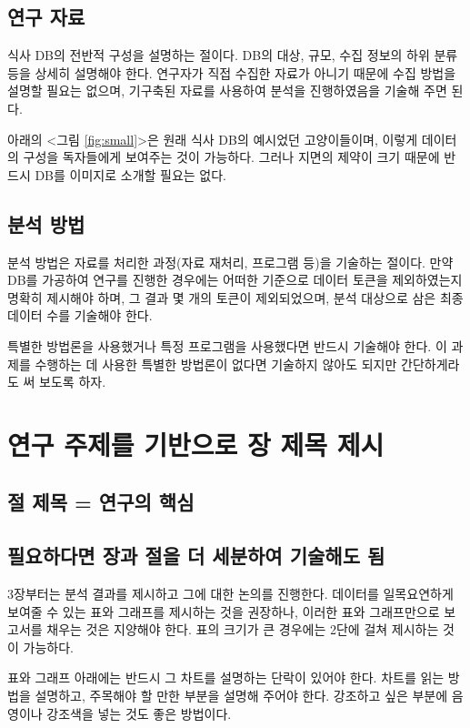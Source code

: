 \subsection{연구 자료}
식사 DB의 전반적 구성을 설명하는 절이다. DB의 대상, 규모, 수집 정보의 하위 분류 등을 상세히 설명해야 한다. 연구자가 직접 수집한 자료가 아니기 때문에 수집 방법을 설명할 필요는 없으며, 기구축된 자료를 사용하여 분석을 진행하였음을 기술해 주면 된다. 

아래의 <그림 \ref{fig:small}>은 원래 식사 DB의 예시었던 고양이들이며, 이렇게 데이터의 구성을 독자들에게 보여주는 것이 가능하다. 그러나 지면의 제약이 크기 때문에 반드시 DB를 이미지로 소개할 필요는 없다.

\subsection{분석 방법}
분석 방법은 자료를 처리한 과정(자료 재처리, 프로그램 등)을 기술하는 절이다. 만약 DB를 가공하여 연구를 진행한 경우에는 어떠한 기준으로 데이터 토큰을 제외하였는지 명확히 제시해야 하며, 그 결과 몇 개의 토큰이 제외되었으며, 분석 대상으로 삼은 최종 데이터 수를 기술해야 한다. 

특별한 방법론을 사용했거나 특정 프로그램을 사용했다면 반드시 기술해야 한다. 이 과제를 수행하는 데 사용한 특별한 방법론이 없다면 기술하지 않아도 되지만 간단하게라도 써 보도록 하자.

\section{연구 주제를 기반으로 장 제목 제시}

\subsection{절 제목 = 연구의 핵심}

\subsection{필요하다면 장과 절을 더 세분하여 기술해도 됨}

3장부터는 분석 결과를 제시하고 그에 대한 논의를 진행한다. 데이터를 일목요연하게 보여줄 수 있는 표와 그래프를 제시하는 것을 권장하나, 이러한 표와 그래프만으로 보고서를 채우는 것은 지양해야 한다. 표의 크기가 큰 경우에는 2단에 걸쳐 제시하는 것이 가능하다. 



표와 그래프 아래에는 반드시 그 차트를 설명하는 단락이 있어야 한다. 차트를 읽는 방법을 설명하고, 주목해야 할 만한 부분을 설명해 주어야 한다. 강조하고 싶은 부분에 음영이나 강조색을 넣는 것도 좋은 방법이다.

